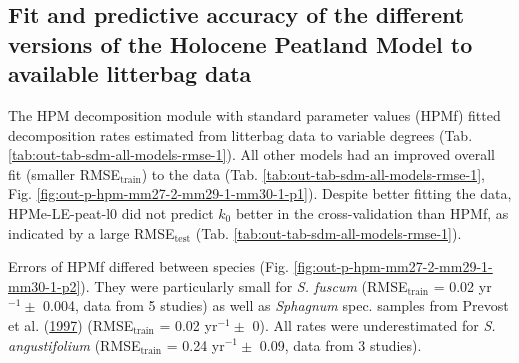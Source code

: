 \documentclass[
  12pt,
]{article}
\begin{document}
\hypertarget{fit-and-predictive-accuracy-of-the-different-versions-of-the-holocene-peatland-model-to-available-litterbag-data}{%
\subsection{Fit and predictive accuracy of the different versions of the Holocene Peatland Model to available litterbag data}\label{fit-and-predictive-accuracy-of-the-different-versions-of-the-holocene-peatland-model-to-available-litterbag-data}}

The HPM decomposition module with standard parameter values (HPMf) fitted decomposition rates estimated from litterbag data to variable degrees (Tab. \ref{tab:out-tab-sdm-all-models-rmse-1}). All other models had an improved overall fit (smaller RMSE\(_\text{train}\)) to the data (Tab. \ref{tab:out-tab-sdm-all-models-rmse-1}, Fig. \ref{fig:out-p-hpm-mm27-2-mm29-1-mm30-1-p1}). Despite better fitting the data, HPMe-LE-peat-l0 did not predict \(k_0\) better in the cross-validation than HPMf, as indicated by a large RMSE\(_\text{test}\) (Tab. \ref{tab:out-tab-sdm-all-models-rmse-1}).

Errors of HPMf differed between species (Fig. \ref{fig:out-p-hpm-mm27-2-mm29-1-mm30-1-p2}). They were particularly small for \emph{S. fuscum} (RMSE\(_\text{train}\) = 0.02 yr\(^{-1} \pm\) 0.004, data from 5 studies) as well as \emph{Sphagnum} spec. samples from Prevost et al. (\protect\hyperlink{ref-Prevost.1997}{1997}) (RMSE\(_\text{train}\) = 0.02 yr\(^{-1} \pm\) 0). All rates were underestimated for \emph{S. angustifolium} (RMSE\(_\text{train}\) = 0.24 yr\(^{-1} \pm\) 0.09, data from 3 studies).
\end{document}
